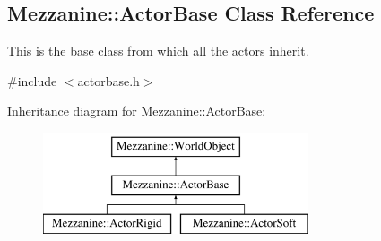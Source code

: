 \hypertarget{classMezzanine_1_1ActorBase}{
\subsection{Mezzanine::ActorBase Class Reference}
\label{classMezzanine_1_1ActorBase}
}


This is the base class from which all the actors inherit.  




{\ttfamily \#include $<$actorbase.h$>$}

Inheritance diagram for Mezzanine::ActorBase:\begin{figure}[H]
\begin{center}
\leavevmode
\includegraphics[height=3.000000cm]{classMezzanine_1_1ActorBase}
\end{center}
\end{figure}
